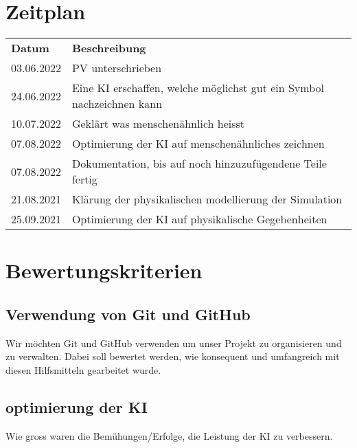 \documentclass{article}
\begin{document}
\section{Zeitplan}
\label{chap:zeitplan}
\begin{table}[H]
    \begin{tabular}{ll}
    \textbf{Datum} & \textbf{Beschreibung}                                                                         \\
    03.06.2022     & PV unterschrieben                                                                             \\
    24.06.2022     & Eine KI erschaffen, welche möglichst gut ein Symbol nachzeichnen kann                         \\
    10.07.2022     & Geklärt was menschenähnlich heisst                                                            \\
    07.08.2022     & Optimierung der KI auf menschenähnliches zeichnen                                             \\
    07.08.2022     & Dokumentation, bis auf noch hinzuzufügendene Teile fertig                                     \\
    21.08.2021     & Klärung der physikalischen modellierung der Simulation                                        \\
    25.09.2021     & Optimierung der KI auf physikalische Gegebenheiten                                            \\
    \end{tabular}
\end{table}

\section{Bewertungskriterien}
\subsection{Verwendung von Git und GitHub}
\label{chap:git_github}
Wir möchten Git und GitHub verwenden um unser Projekt zu organisieren und zu verwalten. 
Dabei soll bewertet werden, wie konsequent und umfangreich mit diesen Hilfsmitteln gearbeitet wurde.

\subsection{optimierung der KI}
\label{chap:optimierung}
Wie gross waren die Bemühungen/Erfolge, die Leistung der KI zu verbessern.
\end{document}
